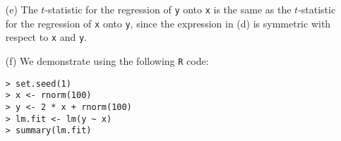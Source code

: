 \begin{itemize}
\begin{proof}
\begin{equation*}
\begin{split}
                        - 2y_ix_i \Biggl[\sum_{i'=1}^n x_{i'}^2\Biggr]
                        \Biggl[\sum_{i'=1}^n x_{i'}y_{i'}\Biggr] \\ 
                    &+ x_i^2 {\Biggl[\sum_{i'=1}^n x_{i'}y_{i'}\Biggr]}^2 \Biggr) / 
                        {\Biggl[\sum_{i'=1}^n x_{i'}^2\Biggr]}^2,
                \end{split}
            \end{equation*}
            so that
            \begin{equation*}
                \begin{split}
                    \qquad &\Biggl(\sum_{i'=1}^n x_{i'}^2\Biggr)
                    \Biggl[\sum_{i=1}^n {(y_i - x_i\hat{\beta})}^2\Biggr] \\
                    = &\, \Biggl(\sum_{i'=1}^n x_{i'}^2\Biggr)
                    \Biggl(\sum_{i=1}^n y_i^2 - \sum_{i=1}^n {(x_i\hat{\beta})}^2\Biggr) \\
                    = &\, \Biggl(\sum_{i'=1}^n x_{i'}^2\Biggr)
                    \Biggl(\sum_{i'=1}^n y_{i'}^2 \Biggr) 
                    - \Biggl(\sum_{i'=1}^n x_{i'}^2\Biggr)
                    \Biggl(\sum_{i=1}^n {(x_i\hat{\beta})}^2\Biggr) \\
                    = &\, \Biggl(\sum_{i=1}^n x_i^2\Biggr)
                    \Biggl(\sum_{i'=1}^n y_{i'}^2 \Biggr)
                    - {\Biggl(\sum_{i'=1}^n x_{i'}y_{i'}\Biggr)}^2.
                \end{split}
            \end{equation*}
            Thus, we have
            \begin{equation*}
                \begin{split}
                    \frac{\hat{\beta}}{\text{SE}(\hat{\beta})}
                    &= \frac{(\sqrt{n - 1})\sum_{i=1}^n x_i y_i}
                        {
                            \sqrt{\bigl(\sum_{i=1}^n x_i^2\bigr)
                            \bigl(\sum_{i'=1}^n y_{i'}^2\bigr)
                            - {\bigl(\sum_{i'=1}^n x_{i'}y_{i'}\bigr)}^2}
                        }.
                \end{split}
            \end{equation*}
        \end{proof}
    \item[(e)] The $t$-statistic for the regression of \verb|y| onto \verb|x| is
        the same as the $t$-statistic for the regression of \verb|x| onto \verb|y|,
        since the expression in (d) is symmetric with respect to \verb|x| and 
        \verb|y|.
    \item[(f)] We demonstrate using the following \verb|R| code:
        \scriptsize\begin{verbatim}
> set.seed(1)
> x <- rnorm(100)
> y <- 2 * x + rnorm(100)
> lm.fit <- lm(y ~ x)
> summary(lm.fit)


\end{verbatim}
\end{itemize}
